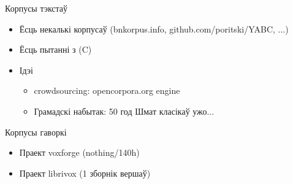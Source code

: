 \begin{frame}{Корпусы тэкстаў}
\begin{itemize}
  \item Ёсць некалькі корпусаў (bnkorpus.info, github.com/poritski/YABC, ...)
  \item Ёсць пытанні з (C)
  \item Ідэі
   \begin{itemize}
     \item crowdsourcing: opencorpora.org engine
     \item Грамадскі набытак: 50 год Шмат класікаў ужо...
   \end{itemize} 
\end{itemize}
\end{frame}

\begin{frame}{Корпусы гаворкі}
  \begin{itemize}
    \item Праект voxforge (nothing/140h)
    \item Праект librivox (1 зборнік вершаў)
  \end{itemize}
\end{frame}


